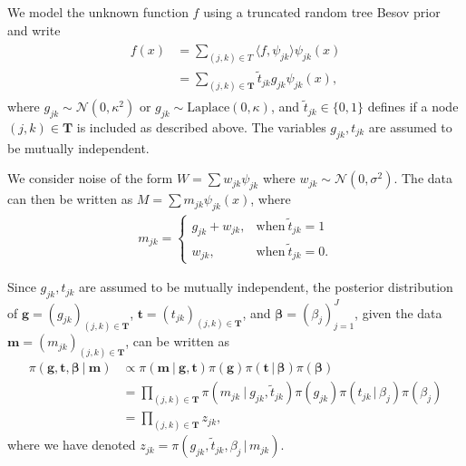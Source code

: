 \documentclass[11pt,a4paper]{article}
\newcommand{\g}{{\, |\,}}
\newcommand{\wt}{{\widetilde t}}
\newcommand{\Nn}{{\mathcal N}}
\newcommand{\oT}{\boldsymbol{T}}
\begin{document}
We model the unknown function $f$ using a truncated random tree Besov prior and write 
\begin{align}\label{eq:DefPrior}
\begin{split}
f(x) & =\sum_{(j,k)\in T} \langle f,\psi_{jk}\rangle\psi_{jk}(x)\\
& =\sum_{(j,k)\in \oT} \wt_{jk} g_{jk}\psi_{jk}(x),
\end{split}
\end{align}
where $g_{jk} \sim \Nn(0,\kappa^2)$ or $g_{jk} \sim \text{Laplace}(0,\kappa)$, and $\wt_{jk}\in\{0,1\}$ defines if a node $(j,k)\in \oT$ is included as described above. The variables $g_{jk}, t_{jk}$ are assumed to be mutually independent.

We consider noise of the form $W=\sum w_{jk}\psi_{jk}$ where $w_{jk}\sim \Nn(0,\sigma^2)$. 
The data can then be written as $M=\sum m_{jk}\psi_{jk}(x)$, where
\begin{align*}
m_{jk}=\left\{\begin{array}{ll}g_{jk}+w_{jk}, & \textrm{when}\ \wt_{jk}=1\\
w_{jk}, & \textrm{when}\ \wt_{jk}=0. \end{array} \right.
\end{align*}

Since $g_{jk}, t_{jk}$ are assumed to be mutually independent, the posterior distribution of $\boldsymbol{g}=(g_{jk})_{(j,k)\in\oT}$, $\boldsymbol{t}=(t_{jk})_{(j,k)\in\oT}$, and $\boldsymbol{\beta}=(\beta_j)_{j=1}^J$, given the data $\boldsymbol{m}=(m_{jk})_{(j,k)\in\oT}$, can be written as
\begin{align*}
\pi(\boldsymbol{g},\boldsymbol{t},\boldsymbol{\beta}\ |\ \boldsymbol{m}) & \propto\pi(\boldsymbol{m}\ |\ \boldsymbol{g},\boldsymbol{t})\pi(\boldsymbol{g})\pi(\boldsymbol{t}\g \boldsymbol{\beta})\pi(\boldsymbol{\beta})\\
& =\prod_{(j,k)\in \oT} \pi(m_{jk}\ |\ g_{jk},\wt_{jk})\pi(g_{jk})\pi(t_{jk}\g\beta_j)\pi(\beta_j)\\
& = \prod_{(j,k)\in \oT} z_{jk},
\end{align*}
where we have denoted $z_{jk}=\pi(g_{jk},\widetilde{t}_{jk},\beta_j \g m_{jk})$.
\end{document}
